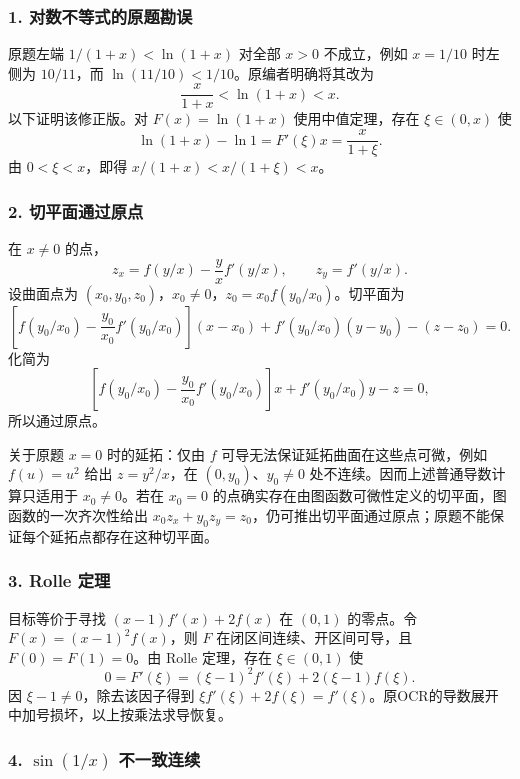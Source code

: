 \documentclass[11pt,fontset=fandol]{ctexart}
\begin{document}
\subsubsection{1.
对数不等式的原题勘误}\label{ux5bf9ux6570ux4e0dux7b49ux5f0fux7684ux539fux9898ux52d8ux8bef}

原题左端 \(1/(1+x)<\ln(1+x)\) 对全部 \(x>0\) 不成立，例如 \(x=1/10\)
时左侧为 \(10/11\)，而 \(\ln(11/10)<1/10\)。原编者明确将其改为 \[
\frac{x}{1+x}<\ln(1+x)<x.
\] 以下证明该修正版。对 \(F(x)=\ln(1+x)\) 使用中值定理，存在
\(\xi\in(0,x)\) 使 \[
\ln(1+x)-\ln1=F'(\xi)x=\frac{x}{1+\xi}.
\] 由 \(0<\xi<x\)，即得 \(x/(1+x)<x/(1+\xi)<x\)。

\subsubsection{2.
切平面通过原点}\label{ux5207ux5e73ux9762ux901aux8fc7ux539fux70b9}

在 \(x\ne0\) 的点， \[
z_x=f(y/x)-\frac yx f'(y/x),\qquad z_y=f'(y/x).
\] 设曲面点为
\((x_0,y_0,z_0)\)，\(x_0\ne0\)，\(z_0=x_0f(y_0/x_0)\)。切平面为 \[
\left[f(y_0/x_0)-\frac{y_0}{x_0}f'(y_0/x_0)\right](x-x_0)
+f'(y_0/x_0)(y-y_0)-(z-z_0)=0.
\] 化简为 \[
\left[f(y_0/x_0)-\frac{y_0}{x_0}f'(y_0/x_0)\right]x+f'(y_0/x_0)y-z=0,
\] 所以通过原点。

关于原题 \(x=0\) 时的延拓：仅由 \(f\)
可导无法保证延拓曲面在这些点可微，例如 \(f(u)=u^2\) 给出 \(z=y^2/x\)，在
\((0,y_0)\)、\(y_0\ne0\) 处不连续。因而上述普通导数计算只适用于
\(x_0\ne0\)。若在 \(x_0=0\)
的点确实存在由图函数可微性定义的切平面，图函数的一次齐次性给出
\(x_0z_x+y_0z_y=z_0\)，仍可推出切平面通过原点；原题不能保证每个延拓点都存在这种切平面。

\subsubsection{3. Rolle 定理}\label{rolle-ux5b9aux7406}

目标等价于寻找 \((x-1)f'(x)+2f(x)\) 在 \((0,1)\) 的零点。令
\(F(x)=(x-1)^2f(x)\)，则 \(F\) 在闭区间连续、开区间可导，且
\(F(0)=F(1)=0\)。由 Rolle 定理，存在 \(\xi\in(0,1)\) 使 \[
0=F'(\xi)=(\xi-1)^2f'(\xi)+2(\xi-1)f(\xi).
\] 因 \(\xi-1\ne0\)，除去该因子得到
\(\xi f'(\xi)+2f(\xi)=f'(\xi)\)。原OCR的导数展开中加号损坏，以上按乘法求导恢复。

\subsubsection{\texorpdfstring{4. \(\sin(1/x)\)
不一致连续}{4. \textbackslash sin(1/x) 不一致连续}}\label{sin1x-ux4e0dux4e00ux81f4ux8fdeux7eed}
\end{document}
